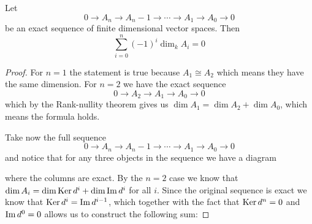 \begin{lemma}
Let 
\begin{equation*}
    0\longrightarrow A_n \longrightarrow A_n-1 \longrightarrow \cdots \longrightarrow A_1 \longrightarrow A_0 \longrightarrow 0
\end{equation*}
be an exact sequence of finite dimensional vector spaces. Then 
\begin{equation*}
    \sum_{i=0}^n (-1)^i \dim_k A_i = 0
\end{equation*}
\end{lemma}
\begin{proof}
For $n=1$ the statement is true because $A_1\cong A_2$ which means they have the same dimension. For $n = 2$ we have the exact sequence 
\begin{equation*}
    0\longrightarrow A_2\longrightarrow A_1 \longrightarrow A_0\longrightarrow 0 
\end{equation*}
which by the Rank-nullity theorem gives us $\dim A_1 = \dim A_2 + \dim A_0$, which means the formula holds.  

Take now the full sequence 
\begin{equation*}
    0\longrightarrow A_n \longrightarrow A_n-1 \longrightarrow \cdots \longrightarrow A_1 \longrightarrow A_0 \longrightarrow 0
\end{equation*}
and notice that for any three objects in the sequence we have a diagram
\begin{center}
\end{center}
where the columns are exact. By the $n=2$ case we know that $\dim A_i = \dim \operatorname{Ker} d^i + \dim \operatorname{Im} d^i$ for all $i$. Since the original sequence is exact we know that $\operatorname{Ker} d^i = \operatorname{Im} d^{i-1}$, which together with the fact that $\operatorname{Ker} d^n = 0$ and $\operatorname{Im} d^0 = 0$ allows us to construct the following sum:


\end{proof}
